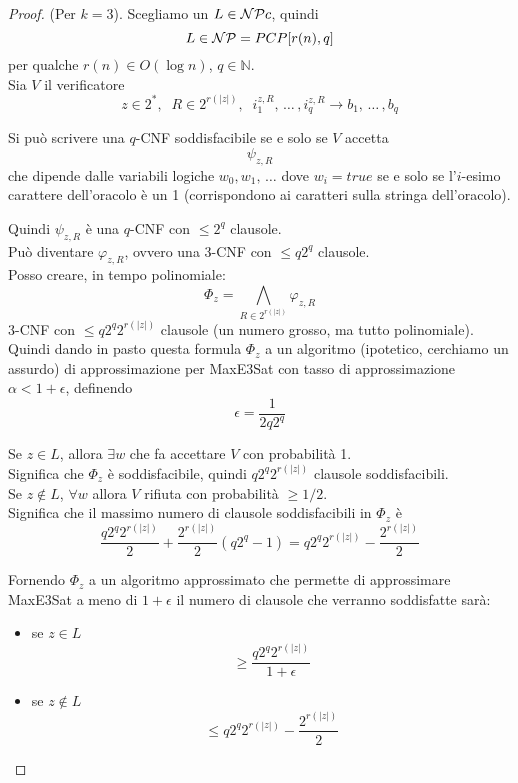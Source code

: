 \begin{proof}
	(Per $k=3$). Scegliamo un $L \in \mathcal{NP} c$, quindi 
	$$ L \in \mathcal{NP} = PCP [r(n), q] $$
	per qualche $r(n) \in O(\log n)$, $q \in \mathbb{N}$.\\
	
	Sia $V$ il verificatore
	$$ z \in 2^\ast, \;\; R \in 2^{r(|z|)},\;\; i_1^{z,R}, \, \dots \, , i_q^{z,R} \rightarrow b_1, \, \dots \, ,b_q $$
	
	Si può scrivere una $q$-CNF soddisfacibile se e solo se $V$ accetta
	$$ \psi_{z,R} $$
	che dipende dalle variabili logiche $w_0, w_1, \, \dots$ dove $w_i = true$ se e solo se l'$i$-esimo carattere dell'oracolo è un 1 (corrispondono ai caratteri sulla stringa dell'oracolo).\\
	
	\newpage
	
	Quindi $\psi_{z,R}$ è una $q$-CNF con $\leq 2^q$ clausole.\\
	Può diventare $\varphi_{z,R}$, ovvero una 3-CNF con $\leq q 2^q$ clausole.\\
	
	Posso creare, in tempo polinomiale: 
	$$ \Phi_z = \bigwedge_{R \in 2^{r (|z|)}} \varphi_{z,R} $$
	3-CNF con $\leq q 2^q 2^{r (|z|)}$ clausole (un numero grosso, ma tutto polinomiale).\\
	
	Quindi dando in pasto questa formula $\Phi_z$ a un algoritmo (ipotetico, cerchiamo un assurdo) di approssimazione per MaxE3Sat con tasso di approssimazione $\alpha < 1+ \epsilon$, definendo
	$$ \epsilon = \frac{1}{2q2^q} $$
	
	Se $z \in L$, allora $\exists w$ che fa accettare $V$ con probabilità 1.\\
	Significa che $\Phi_z$ è soddisfacibile, quindi $q2^q2^{r(|z|)}$ clausole soddisfacibili.\\
	
	Se $z \notin L$, $\forall w$ allora $V$ rifiuta con probabilità $\geq 1/2$.\\
	Significa che il massimo numero di clausole soddisfacibili in $\Phi_z$ è 
	$$ \frac{q2^q2^{r(|z|)}}{2} + \frac{2^{r(|z|)}}{2} (q2^q - 1) 
	=  q2^q2^{r(|z|)} - \frac{2^{r(|z|)}}{2}
	$$
	
	Fornendo $\Phi_z$ a un algoritmo approssimato che permette di approssimare MaxE3Sat a meno di $1+\epsilon$ il numero di clausole che verranno soddisfatte sarà: 
	\begin{itemize}
		\item se $z \in L$
		$$ \geq \frac{q2^q 2^{r(|z|)}}{1 + \epsilon} $$
		\item se $z \notin L$
		$$ \leq q2^q2^{r(|z|)} - \frac{2^{r(|z|)}}{2} $$
	\end{itemize}
	

\end{proof}
